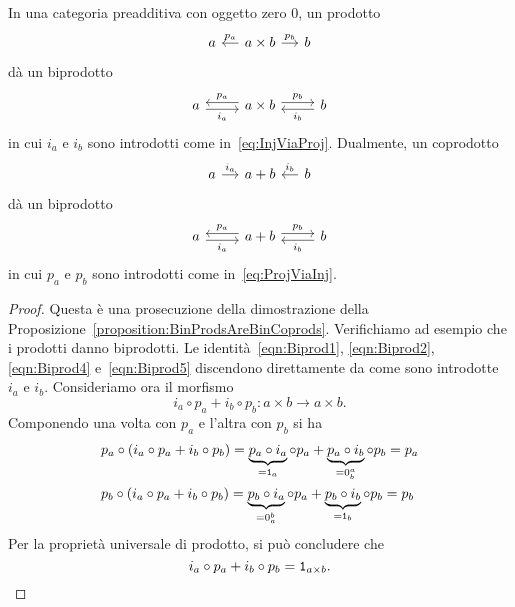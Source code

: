 \begin{proposition}\label{proposition:ProdsAndCoprodsAreBiprods}
  In una categoria preadditiva con oggetto zero \(0\), un prodotto
  \[
    \begin{tikzcd}[column sep=small]
      a & a \times b \ar["{p_a}", l, swap] \ar["{p_b}", r] & b
    \end{tikzcd}
  \]
  dà un biprodotto
  \[
    \begin{tikzcd}
      a \ar["{i_a}", r, shift right, swap] & a \times b \ar["{p_a}", l,
      shift right, swap] \ar["{p_b}", r, shift left] & b \ar["{i_b}", l,
      shift left]
    \end{tikzcd}
  \]
  in cui \(i_a\) e \(i_b\) sono introdotti come
  in~\eqref{eq:InjViaProj}. Dualmente, un coprodotto
  \[
    \begin{tikzcd}[column sep=small]
      a \ar["{i_a}", r] & a + b & b \ar["{i_b}", l, swap]
    \end{tikzcd}
  \]
  dà un biprodotto
  \[
    \begin{tikzcd}
      a \ar["{i_a}", r, shift right, swap] & a+b \ar["{p_a}", l, shift
      right, swap] \ar["{p_b}", r, shift left] & b \ar["{i_b}", l, shift
      left]
    \end{tikzcd}
  \]
  in cui \(p_a\) e \(p_b\) sono introdotti come
  in~\eqref{eq:ProjViaInj}.
\end{proposition}

\begin{proof}
  Questa è una prosecuzione della dimostrazione della
  Proposizione~\ref{proposition:BinProdsAreBinCoprods}. Verifichiamo ad
  esempio che i prodotti danno biprodotti. Le
  identità~\eqref{eqn:Biprod1}, \eqref{eqn:Biprod2}, \eqref{eqn:Biprod4}
  e~\eqref{eqn:Biprod5} discendono direttamente da come sono introdotte
  \(i_a\) e \(i_b\). Consideriamo ora il morfismo
  \[
    i_a \circ p_a + i_b \circ p_b : a \times b \to a \times b .
  \]
  Componendo una volta con \(p_a\) e l'altra con \(p_b\) si ha
  \begin{align*}
    & p_a \circ \left(i_a \circ p_a + i_b \circ p_b\right) = \underbrace{p_a \circ
      i_a}_{= \id_a} \circ p_a + \underbrace{p_a
      \circ i_b}_{= 0_b^a} \circ p_b = p_a \\
    & p_b \circ \left(i_a \circ p_a + i_b \circ p_b\right) = \underbrace{p_b \circ
      i_a}_{= 0_a^b} \circ p_a + \underbrace{p_b
      \circ i_b}_{= \id_b} \circ p_b = p_b
  \end{align*}
  Per la proprietà universale di prodotto, si può concludere che
  \[
    i_a \circ p_a + i_b \circ p_b = \mathtt 1_{a \times b} . \qedhere
  \]
\end{proof}

